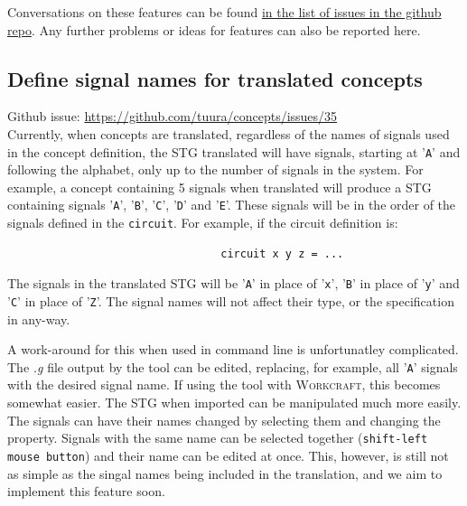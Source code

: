 \documentclass[british,technote,compsoc]{IEEEtran}
\newcommand{\noun}[1]{\textsc{#1}}
\begin{document}
Conversations on these features can be found \href{https://github.com/tuura/concepts/issues}{in the list of issues in the github repo}. 
Any further problems or ideas for features can also be reported here.

\subsection*{Define signal names for translated concepts}

Github issue: \url{https://github.com/tuura/concepts/issues/35}\\

Currently, when concepts are translated, regardless of the names of signals used in the concept definition, the STG translated will have signals, starting at '\texttt{A}' and following the 
alphabet, only up to the number of signals in the system. For example, a concept containing 5 signals when translated will produce a STG containing signals '\texttt{A}', '\texttt{B}', 
'\texttt{C}', '\texttt{D}' and '\texttt{E}'. These signals will be in the order of the signals defined in the \texttt{circuit}. For example, if the circuit definition is:


\begin{verbatim}
                                 circuit x y z = ...
\end{verbatim}

\noindent The signals in the translated STG will be '\texttt{A}' in place of '\texttt{x}', '\texttt{B}' in place of '\texttt{y}' and '\texttt{C}' in place of '\texttt{Z}'.  
The signal names will not affect their type, or the specification in any-way. 

A work-around for this when used in command line is unfortunatley complicated. 
The \emph{.g} file output by the tool can be edited, replacing, for example, all '\texttt{A}' signals with the desired signal name.
If using the tool with \noun{Workcraft}, this becomes somewhat easier. The STG when imported can be manipulated much more easily. 
The signals can have their names changed by selecting them and changing the property. 
Signals with the same name can be selected together (\texttt{shift-left mouse button}) and their name can be edited at once. 
This, however, is still not as simple as the singal names being included in the translation, and we aim to implement this feature soon. 

\newpage



\end{document}
